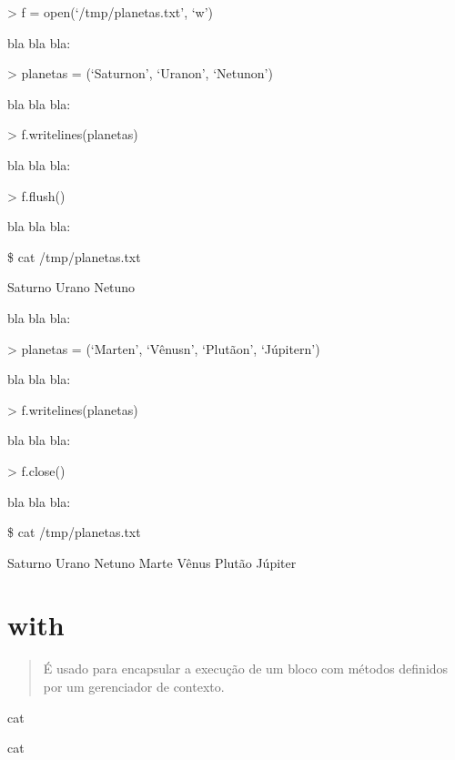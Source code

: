 \documentclass[letterpaper,10pt,brazil]{sphinxmanual}
\begin{document}
\textgreater{} f = open(‘/tmp/planetas.txt’, ‘w’)

bla bla bla:

\textgreater{} planetas = (‘Saturnon’, ‘Uranon’, ‘Netunon’)

bla bla bla:

\textgreater{} f.writelines(planetas)

bla bla bla:

\textgreater{} f.flush()

bla bla bla:

\$ cat /tmp/planetas.txt

Saturno
Urano
Netuno

bla bla bla:

\textgreater{} planetas = (‘Marten’, ‘Vênusn’, ‘Plutãon’, ‘Júpitern’)

bla bla bla:

\textgreater{} f.writelines(planetas)

bla bla bla:

\textgreater{} f.close()

bla bla bla:

\$ cat /tmp/planetas.txt

Saturno
Urano
Netuno
Marte
Vênus
Plutão
Júpiter


\chapter{with}
\label{\detokenize{content/with:with}}\label{\detokenize{content/with::doc}}\begin{quote}

É usado para encapsular a execução de um bloco com métodos definidos por um gerenciador de contexto.
\end{quote}

\begin{sphinxVerbatim}[commandchars=\\\{\}]
\PYGZdl{} cat 


\PYGZdl{} cat 
\end{sphinxVerbatim}

\begin{sphinxVerbatim}[commandchars=\\\{\}]
   

   

\end{sphinxVerbatim}
\end{document}
